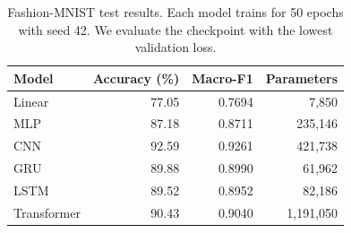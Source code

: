 \begin{table}[htbp]
\centering\small
\caption{Fashion-MNIST test results. Each model trains for 50 epochs with seed 42. We evaluate the checkpoint with the lowest validation loss.}
\label{tab:comparison}
\begin{tabular}{lrrr}
\toprule
Model & Accuracy (\%) & Macro-F1 & Parameters\\\midrule
Linear & 77.05 & 0.7694 & 7,850\\
MLP & 87.18 & 0.8711 & 235,146\\
CNN & 92.59 & 0.9261 & 421,738\\
GRU & 89.88 & 0.8990 & 61,962\\
LSTM & 89.52 & 0.8952 & 82,186\\
Transformer & 90.43 & 0.9040 & 1,191,050\\
\bottomrule
\end{tabular}
\end{table}
